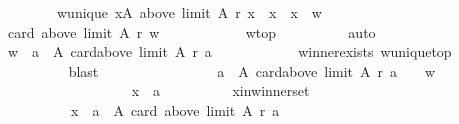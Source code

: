 \begin{isabellebody}
\ \ \ \ \ \ \ \ w{\isacharunderscore}{\kern0pt}unique{\isacharcolon}{\kern0pt}\ {\isachardoublequoteopen}{\isasymforall}x{\isasymin}A{\isachardot}{\kern0pt}\ above\ {\isacharparenleft}{\kern0pt}limit\ A\ r{\isacharparenright}{\kern0pt}\ x\ {\isacharequal}{\kern0pt}\ {\isacharbraceleft}{\kern0pt}x{\isacharbraceright}{\kern0pt}\ {\isasymlongrightarrow}\ x\ {\isacharequal}{\kern0pt}\ w{\isachardoublequoteclose}\isanewline
\ \ \ \ \ \ \isamarkupfalse%
\ {\isachardoublequoteopen}card\ {\isacharparenleft}{\kern0pt}above\ {\isacharparenleft}{\kern0pt}limit\ A\ r{\isacharparenright}{\kern0pt}\ w{\isacharparenright}{\kern0pt}\ {\isasymle}\ {}{\isachardoublequoteclose}\isanewline
\ \ \ \ \ \ \ \ \isamarkupfalse%
\ w{\isacharunderscore}{\kern0pt}top\isanewline
\ \ \ \ \ \ \ \ \isamarkupfalse%
\ auto\isanewline
\ \ \ \ \ \ \isamarkupfalse%
\ {\isachardoublequoteopen}{\isacharbraceleft}{\kern0pt}w{\isacharbraceright}{\kern0pt}\ {\isasymsubseteq}\ {\isacharbraceleft}{\kern0pt}a\ {\isasymin}\ A{\isachardot}{\kern0pt}\ card{\isacharparenleft}{\kern0pt}above\ {\isacharparenleft}{\kern0pt}limit\ A\ r{\isacharparenright}{\kern0pt}\ a{\isacharparenright}{\kern0pt}\ {\isasymle}\ {}{\isacharbraceright}{\kern0pt}{\isachardoublequoteclose}\isanewline
\ \ \ \ \ \ \ \ \isamarkupfalse%
\ winner{\isacharunderscore}{\kern0pt}exists\ w{\isacharunderscore}{\kern0pt}unique{\isacharunderscore}{\kern0pt}top\isanewline
\ \ \ \ \ \ \ \ \isamarkupfalse%
\ blast\isanewline
\ \ \ \ \ \ \isamarkupfalse%
\ \isamarkupfalse%
\isanewline
\ \ \ \ \ \ \ \ {\isachardoublequoteopen}{\isacharbraceleft}{\kern0pt}a\ {\isasymin}\ A{\isachardot}{\kern0pt}\ card{\isacharparenleft}{\kern0pt}above\ {\isacharparenleft}{\kern0pt}limit\ A\ r{\isacharparenright}{\kern0pt}\ a{\isacharparenright}{\kern0pt}\ {\isasymle}\ {}{\isacharbraceright}{\kern0pt}\ {\isasymsubseteq}\ {\isacharbraceleft}{\kern0pt}w{\isacharbraceright}{\kern0pt}{\isachardoublequoteclose}\isanewline
\ \ \ \ \ \ \isamarkupfalse%
\isanewline
\ \ \ \ \ \ \ \ \isamarkupfalse%
\isanewline
\ \ \ \ \ \ \ \ \ \ x\ {\isacharcolon}{\kern0pt}{\isacharcolon}{\kern0pt}\ {\isachardoublequoteopen}{\isacharprime}{\kern0pt}a{\isachardoublequoteclose}\isanewline
\ \ \ \ \ \ \ \ \isamarkupfalse%
\ x{\isacharunderscore}{\kern0pt}in{\isacharunderscore}{\kern0pt}winner{\isacharunderscore}{\kern0pt}set{\isacharcolon}{\kern0pt}\isanewline
\ \ \ \ \ \ \ \ \ \ {\isachardoublequoteopen}x\ {\isasymin}\ {\isacharbraceleft}{\kern0pt}a\ {\isasymin}\ A{\isachardot}{\kern0pt}\ card\ {\isacharparenleft}{\kern0pt}above\ {\isacharparenleft}{\kern0pt}limit\ A\ r{\isacharparenright}{\kern0pt}\ a{\isacharparenright}{\kern0pt}\ {\isasymle}\ {}{\isacharbraceright}{\kern0pt}{\isachardoublequoteclose}\isanewline

\end{isabellebody}
